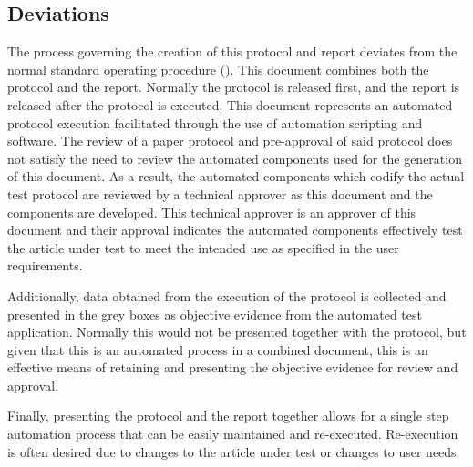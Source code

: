 \subsection{Deviations}
The process governing the creation of this protocol and report deviates from the
normal standard operating procedure (\sopPAP).  This document combines both the
protocol and the report.  Normally the protocol is released first, and the report is
released after the protocol is executed.  This document represents an automated
protocol execution facilitated through the use of automation scripting and
software.  The review of a paper protocol and pre-approval of said protocol does
not satisfy the need to review the automated components used for the generation
of this document.  As a result, the automated components which codify the actual
test protocol are reviewed by a technical approver as this document and the
components are developed.  This technical approver is an approver of this
document and their approval indicates the automated components effectively test
the article under test to meet the intended use as specified in the user
requirements.

\tlcVspace

Additionally, data obtained from the execution of the protocol is collected and
presented in the grey boxes as objective evidence from the automated test
application.  Normally this would not be presented together with the protocol,
but given that this is an automated process in a combined document, this is an
effective means of retaining and presenting the objective evidence for review
and approval.

\tlcVspace

Finally, presenting the protocol and the report together allows for a single
step automation process that can be easily maintained and re-executed.
Re-execution is often desired due to changes to the article under test or
changes to user needs.
